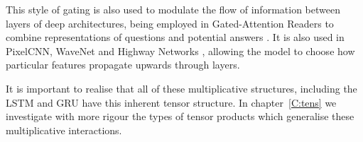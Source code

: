 This style of gating is also used to modulate the flow of information between layers of deep 
architectures, being employed in Gated-Attention Readers
to combine representations of questions and potential answers \autocite{Dhingra2016}. It is also used
in PixelCNN, WaveNet and Highway Networks \autocite{VandenOord2016, Oord2016, Srivastava2015}, 
allowing the model to choose how
particular features propagate upwards through layers.

It is important to realise that all of these multiplicative structures, including the LSTM and GRU
have this inherent tensor
structure. In chapter~\ref{C:tens} we investigate with more
rigour the types of tensor products which generalise these multiplicative interactions.
